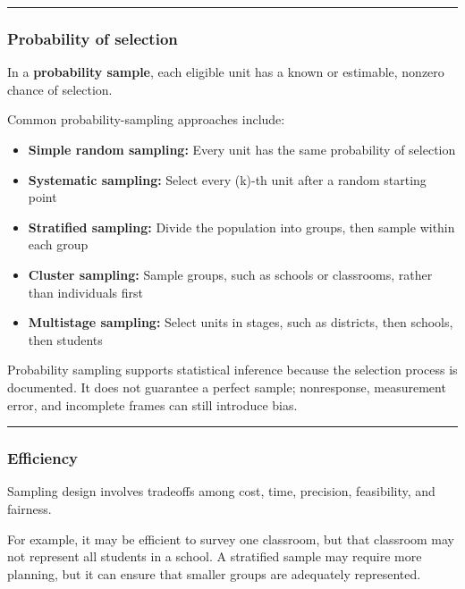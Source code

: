 \documentclass[
  letterpaper,
  DIV=11,
  numbers=noendperiod]{scrartcl}
\providecommand{\tightlist}{%
  \setlength{\itemsep}{0pt}\setlength{\parskip}{0pt}}\usepackage{longtable,booktabs,array}
\begin{document}
\begin{center}\rule{0.5\linewidth}{0.5pt}\end{center}

\subsubsection{Probability of selection}\label{probability-of-selection}

In a \textbf{probability sample}, each eligible unit has a known or
estimable, nonzero chance of selection.

Common probability-sampling approaches include:

\begin{itemize}
\tightlist
\item
  \textbf{Simple random sampling:} Every unit has the same probability
  of selection
\item
  \textbf{Systematic sampling:} Select every (k)-th unit after a random
  starting point
\item
  \textbf{Stratified sampling:} Divide the population into groups, then
  sample within each group
\item
  \textbf{Cluster sampling:} Sample groups, such as schools or
  classrooms, rather than individuals first
\item
  \textbf{Multistage sampling:} Select units in stages, such as
  districts, then schools, then students
\end{itemize}

Probability sampling supports statistical inference because the
selection process is documented. It does not guarantee a perfect sample;
nonresponse, measurement error, and incomplete frames can still
introduce bias.

\begin{center}\rule{0.5\linewidth}{0.5pt}\end{center}

\subsubsection{Efficiency}\label{efficiency}

Sampling design involves tradeoffs among cost, time, precision,
feasibility, and fairness.

For example, it may be efficient to survey one classroom, but that
classroom may not represent all students in a school. A stratified
sample may require more planning, but it can ensure that smaller groups
are adequately represented.
\end{document}

